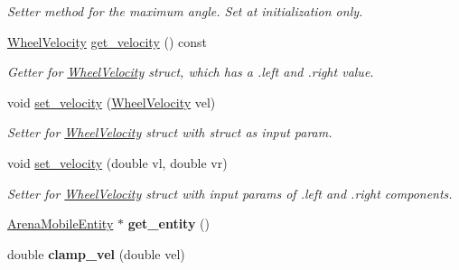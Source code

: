 \begin{DoxyCompactItemize}
\begin{DoxyCompactList}\small\item\em Setter method for the maximum angle. Set at initialization only. \end{DoxyCompactList}\item 
\hyperlink{structWheelVelocity}{Wheel\+Velocity} \hyperlink{classMotionHandler_a99fe1b248e817556de2b366a2d98c57c}{get\+\_\+velocity} () const \hypertarget{classMotionHandler_a99fe1b248e817556de2b366a2d98c57c}{}\label{classMotionHandler_a99fe1b248e817556de2b366a2d98c57c}

\begin{DoxyCompactList}\small\item\em Getter for \hyperlink{structWheelVelocity}{Wheel\+Velocity} struct, which has a .left and .right value. \end{DoxyCompactList}\item 
void \hyperlink{classMotionHandler_ac4bf67ba783c1afb5a5839229de3f3f9}{set\+\_\+velocity} (\hyperlink{structWheelVelocity}{Wheel\+Velocity} vel)\hypertarget{classMotionHandler_ac4bf67ba783c1afb5a5839229de3f3f9}{}\label{classMotionHandler_ac4bf67ba783c1afb5a5839229de3f3f9}

\begin{DoxyCompactList}\small\item\em Setter for \hyperlink{structWheelVelocity}{Wheel\+Velocity} struct with struct as input param. \end{DoxyCompactList}\item 
void \hyperlink{classMotionHandler_af31975aa667ca20835e4d5bb0216706e}{set\+\_\+velocity} (double vl, double vr)\hypertarget{classMotionHandler_af31975aa667ca20835e4d5bb0216706e}{}\label{classMotionHandler_af31975aa667ca20835e4d5bb0216706e}

\begin{DoxyCompactList}\small\item\em Setter for \hyperlink{structWheelVelocity}{Wheel\+Velocity} struct with input params of .left and .right components. \end{DoxyCompactList}\item 
\hyperlink{classArenaMobileEntity}{Arena\+Mobile\+Entity} $\ast$ {\bfseries get\+\_\+entity} ()\hypertarget{classMotionHandler_ad8472612d15be1ada7f919f45d245adc}{}\label{classMotionHandler_ad8472612d15be1ada7f919f45d245adc}

\item 
double {\bfseries clamp\+\_\+vel} (double vel)\hypertarget{classMotionHandler_ace63febeef5e44b20836eeb517e47b6c}{}\label{classMotionHandler_ace63febeef5e44b20836eeb517e47b6c}

\end{DoxyCompactItemize}
